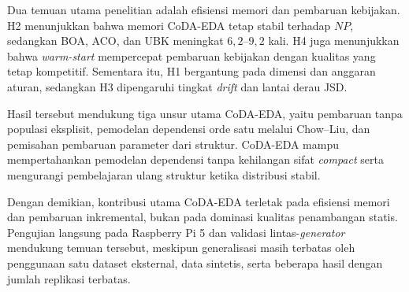 Dua temuan utama penelitian adalah efisiensi memori dan pembaruan kebijakan. 
H2 menunjukkan bahwa memori CoDA-EDA tetap stabil terhadap $NP$, sedangkan BOA, ACO, dan UBK meningkat $6,2$–$9,2$ kali. 
H4 juga menunjukkan bahwa \textit{warm-start} mempercepat pembaruan kebijakan dengan kualitas yang tetap kompetitif. 
Sementara itu, H1 bergantung pada dimensi dan anggaran aturan, sedangkan H3 dipengaruhi tingkat \textit{drift} dan lantai derau JSD.

Hasil tersebut mendukung tiga unsur utama CoDA-EDA, yaitu pembaruan tanpa populasi eksplisit, pemodelan dependensi orde satu melalui Chow–Liu, dan pemisahan pembaruan parameter dari struktur. 
CoDA-EDA mampu mempertahankan pemodelan dependensi tanpa kehilangan sifat \textit{compact} serta mengurangi pembelajaran ulang struktur ketika distribusi stabil.

Dengan demikian, kontribusi utama CoDA-EDA terletak pada efisiensi memori dan pembaruan inkremental, bukan pada dominasi kualitas penambangan statis. 
Pengujian langsung pada Raspberry Pi 5 dan validasi lintas-\textit{generator} mendukung temuan tersebut, meskipun generalisasi masih terbatas oleh penggunaan satu dataset eksternal, data sintetis, serta beberapa hasil dengan jumlah replikasi terbatas.